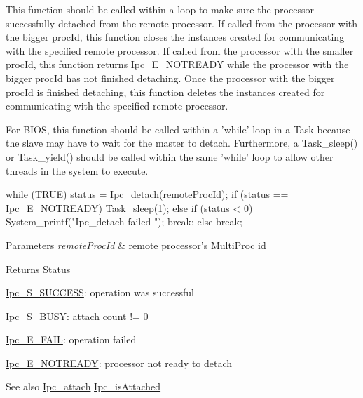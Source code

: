 This function should be called within a loop to make sure the processor successfully detached from the remote processor. If called from the processor with the bigger procId, this function closes the instances created for communicating with the specified remote processor. If called from the processor with the smaller procId, this function returns Ipc\_\-E\_\-NOTREADY while the processor with the bigger procId has not finished detaching. Once the processor with the bigger procId is finished detaching, this function deletes the instances created for communicating with the specified remote processor.

For BIOS, this function should be called within a 'while' loop in a Task because the slave may have to wait for the master to detach. Furthermore, a Task\_\-sleep() or Task\_\-yield() should be called within the same 'while' loop to allow other threads in the system to execute.


\begin{DoxyCode}
  while (TRUE) {
      status = Ipc_detach(remoteProcId);
      if (status == Ipc_E_NOTREADY) {
          Task_sleep(1);
      }
      else if (status < 0) {
          System_printf("Ipc_detach failed \n");
          break;
      }
      else {
          break;
      }
  }
\end{DoxyCode}



\begin{DoxyParams}{Parameters}
{\em remoteProcId} & remote processor's MultiProc id\\
\hline
\end{DoxyParams}
\begin{DoxyReturn}{Returns}
Status
\begin{DoxyItemize}
\item \hyperlink{_ipc_8h_a3f2ce5a89194a828588322cb29548360}{Ipc\_\-S\_\-SUCCESS}: operation was successful
\item \hyperlink{_ipc_8h_a0d668ce8a2a1411b52db7dd0c930e0f0}{Ipc\_\-S\_\-BUSY}: attach count != 0
\item \hyperlink{_ipc_8h_a156e22baea9b53fb663a7bb8684022f1}{Ipc\_\-E\_\-FAIL}: operation failed
\item \hyperlink{_ipc_8h_af61be5fb093e7cd7cb076afc8b2fe798}{Ipc\_\-E\_\-NOTREADY}: processor not ready to detach
\end{DoxyItemize}
\end{DoxyReturn}
\begin{DoxySeeAlso}{See also}
\hyperlink{_ipc_8h_a170f84915df79377080be708302bcb08}{Ipc\_\-attach} \hyperlink{_ipc_8h_a6c17c41b2d25e8b69208082126cde887}{Ipc\_\-isAttached} 
\end{DoxySeeAlso}
